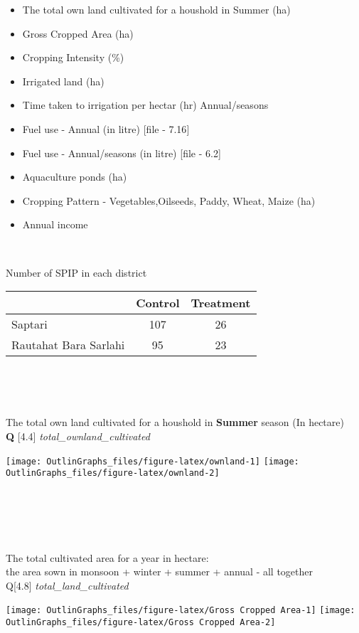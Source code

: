 \documentclass[
]{article}
\begin{document}
\begin{itemize}
\item
  The total own land cultivated for a houshold in Summer (ha)
\item
  Gross Cropped Area (ha)
\item
  Cropping Intensity (\%)
\item
  Irrigated land (ha)
\item
  Time taken to irrigation per hectar (hr) Annual/seasons
\item
  Fuel use - Annual (in litre) {[}file - 7.16{]}
\item
  Fuel use - Annual/seasons (in litre) {[}file - 6.2{]}
\item
  Aquaculture ponds (ha)
\item
  Cropping Pattern - Vegetables,Oilseeds, Paddy, Wheat, Maize (ha)
\item
  Annual income
\end{itemize}

~

Number of SPIP in each district

\begin{tabular}{lcc}
\toprule
  & Control & Treatment\\
\midrule
Saptari & 107 & 26\\
Rautahat Bara Sarlahi & 95 & 23\\
\bottomrule
\end{tabular}

~

~

\noindent
{}
The total own land cultivated for a houshold in \textbf{Summer} season
(In hectare)\\
\textbf{Q} {[}4.4{]} \emph{total\_ownland\_cultivated}

\texttt{[image: OutlinGraphs\_files/figure-latex/ownland-1]}
\texttt{[image: OutlinGraphs\_files/figure-latex/ownland-2]}

~

~

\noindent {}\\
The total cultivated area for a year in hectare:\\
the area sown in monsoon + winter + summer + annual - all together\\
Q{[}4.8{]} \emph{total\_land\_cultivated}

\texttt{[image: OutlinGraphs\_files/figure-latex/Gross Cropped Area-1]}
\texttt{[image: OutlinGraphs\_files/figure-latex/Gross Cropped Area-2]}
\end{document}
